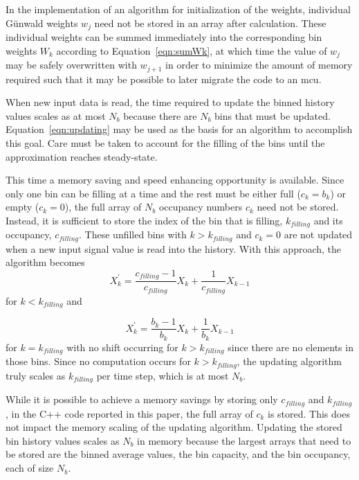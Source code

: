 In the implementation of an algorithm for initialization of the
weights, individual G{\"u}nwald weights $w_j$ need not be stored in an
array after calculation. These individual weights can be summed
immediately into the corresponding bin weights $W_k$ according to
Equation~\ref{eqn:sumWk}, at which time the value of $w_j$ may be
safely overwritten with $w_{j+1}$ in order to minimize the amount of
memory required such that it may be possible to later migrate the code
to an mcu.

When new input data is read, the time required to update the binned history values scales as at most $N_b$ because there are $N_b$ bins that must be
updated. Equation~\ref{eqn:updating} may be used as the basis for an
algorithm to accomplish this goal. Care must be taken to account for
the filling of the bins until the approximation reaches steady-state.

This time a memory saving  and speed enhancing opportunity is available. Since only one bin
can be filling at a time and the rest must be either full ($c_k=b_k$)
or empty ($c_k=0$), the full array of $N_b$ occupancy numbers $c_k$
need not be stored. Instead, it is sufficient to store the index of
the bin that is filling, $k_{filling}$ and its occupancy,
$c_{filling}$. These unfilled bins with $k>k_{filling}$ and $c_k=0$
are not updated when a new input signal value is read into the
history. With this approach, the algorithm becomes
\begin{equation}
X_k^\prime = \frac{c_{filling}-1}{c_{filling}}X_k + \frac{1}{c_{filling}}X_{k-1}
\label{eqn:shift1}
\end{equation}
for $k<k_{filling}$ and

\begin{equation}
X_k^\prime = \frac{b_k-1}{b_k}X_k + \frac{1}{b_k}X_{k-1}
\label{eqn:shift2}
\end{equation}
for $k=k_{filling}$ with no shift occurring for $k>k_{filling}$ since
there are no elements in those bins. Since no computation occurs for $k>k_{filling}$, the updating algorithm truly scales as $k_{filling}$ per time step, which is at most $N_b$. 

While it is possible to achieve a memory savings by storing only
$c_{filling}$ and $k_{filling}$, in the C++ code reported in this
paper, the full array of $c_{k}$ is stored. This does not impact the
memory scaling of the updating algorithm. Updating the stored bin
history values scales as $N_b$ in memory because the largest arrays
that need to be stored are the binned average values, the bin
capacity, and the bin occupancy, each of size $N_b$.

